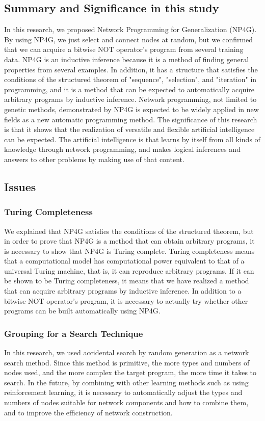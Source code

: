 \documentclass{article}
\begin{document}
\subsection {Summary and Significance in this study}
In this research, we proposed Network Programming for Generalization (NP4G).
By using NP4G, we just select and connect nodes at random, but we confirmed that we can acquire a bitwise NOT operator's program from several training data.
NP4G is an inductive inference because it is a method of finding general properties from several examples.
In addition, it has a structure that satisfies the conditions of the structured theorem of "sequence", "selection", and "iteration" in programming, and it is a method that can be expected to automatically acquire arbitrary programs by inductive inference.
Network programming, not limited to genetic methods, demonstrated by NP4G is expected to be widely applied in new fields as a new automatic programming method.
The significance of this research is that it shows that the realization of versatile and flexible artificial intelligence can be expected. The artificial intelligence is that learns by itself from all kinds of knowledge through network programming, and makes logical inferences and answers to other problems by making use of that content.

\subsection {Issues}
\subsubsection {Turing Completeness}
We explained that NP4G satisfies the conditions of the structured theorem, but in order to prove that NP4G is a method that can obtain arbitrary programs, it is necessary to show that NP4G is Turing complete.
Turing completeness means that a computational model has computational power equivalent to that of a universal Turing machine, that is, it can reproduce arbitrary programs.
If it can be shown to be Turing completeness, it means that we have realized a method that can acquire arbitrary programs by inductive inference.
In addition to a bitwise NOT operator's program, it is necessary to actually try whether other programs can be built automatically using NP4G.

\subsubsection {Grouping for a Search Technique}
In this research, we used accidental search by random generation as a network search method.
Since this method is primitive, the more types and numbers of nodes used, and the more complex the target program, the more time it takes to search.
In the future, by combining with other learning methods such as using reinforcement learning, it is necessary to automatically adjust the types and numbers of nodes suitable for network components and how to combine them, and to improve the efficiency of network construction.
\end{document}

